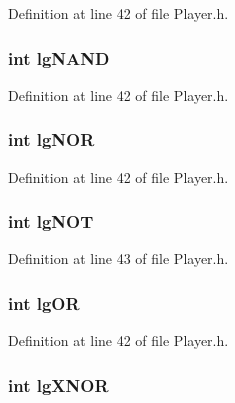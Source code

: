 Definition at line 42 of file Player.\-h.

\hypertarget{struct_logic_gates_a2d08e833a1ea8655875e4ffac0ab07d3}{
\subsubsection[{lg\-N\-A\-N\-D}]{\setlength{\rightskip}{0pt plus 5cm}int lg\-N\-A\-N\-D}}\label{struct_logic_gates_a2d08e833a1ea8655875e4ffac0ab07d3}


Definition at line 42 of file Player.\-h.

\hypertarget{struct_logic_gates_aecc18d1d55579d8aebafc7b06447c18d}{
\subsubsection[{lg\-N\-O\-R}]{\setlength{\rightskip}{0pt plus 5cm}int lg\-N\-O\-R}}\label{struct_logic_gates_aecc18d1d55579d8aebafc7b06447c18d}


Definition at line 42 of file Player.\-h.

\hypertarget{struct_logic_gates_a6cab9b7b339ebd11b190fcf3d7a9d4d4}{
\subsubsection[{lg\-N\-O\-T}]{\setlength{\rightskip}{0pt plus 5cm}int lg\-N\-O\-T}}\label{struct_logic_gates_a6cab9b7b339ebd11b190fcf3d7a9d4d4}


Definition at line 43 of file Player.\-h.

\hypertarget{struct_logic_gates_acf4b5c34b226849120c5e2251246c8cf}{
\subsubsection[{lg\-O\-R}]{\setlength{\rightskip}{0pt plus 5cm}int lg\-O\-R}}\label{struct_logic_gates_acf4b5c34b226849120c5e2251246c8cf}


Definition at line 42 of file Player.\-h.

\hypertarget{struct_logic_gates_a945acef637980ca1476ddb6d12343b72}{
\subsubsection[{lg\-X\-N\-O\-R}]{\setlength{\rightskip}{0pt plus 5cm}int lg\-X\-N\-O\-R}}\label{struct_logic_gates_a945acef637980ca1476ddb6d12343b72}


